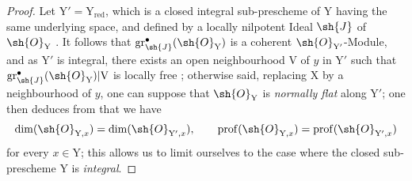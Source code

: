 \begin{proof}
Let $\mathrm{Y}'=\mathrm{Y}_\mathrm{red}$, which is a closed integral sub-prescheme of $\mathrm{Y}$ having the same underlying space, and defined by a locally nilpotent Ideal $\sh{J}$ of $\sh{O}_\mathrm{Y}$ . It follows that $\operatorname{gr}^{\bullet}_{\sh{J}}(\sh{O}_\mathrm{Y})$ is a coherent $\sh{O}_{\mathrm{Y}'}$-Module, and as $\mathrm{Y}'$ is integral, there exists an open neighbourhood $\mathrm{V}$ of $y$ in $\mathrm{Y}'$ such that $\operatorname{gr}^{\bullet}_{\sh{J}}(\sh{O}_\mathrm{Y})|\mathrm{V}$ is locally free ; otherwise said, replacing $\mathrm{X}$ by a neighbourhood of $y$, one can suppose that $\sh{O}_\mathrm{Y}$ is \emph{normally flat} along $\mathrm{Y}'$; one then deduces from  that we have
\[
\dim(\sh{O}_{\mathrm{Y},x})=\dim(\sh{O}_{\mathrm{Y}',x}),\qquad \operatorname{prof}(\sh{O}_{\mathrm{Y},x})=\operatorname{prof}(\sh{O}_{\mathrm{Y}',x})
\]
for every $x\in\mathrm{Y}$; this allows us to limit ourselves to the case where the closed sub-prescheme $\mathrm{Y}$ is \emph{integral}.


\end{proof}
